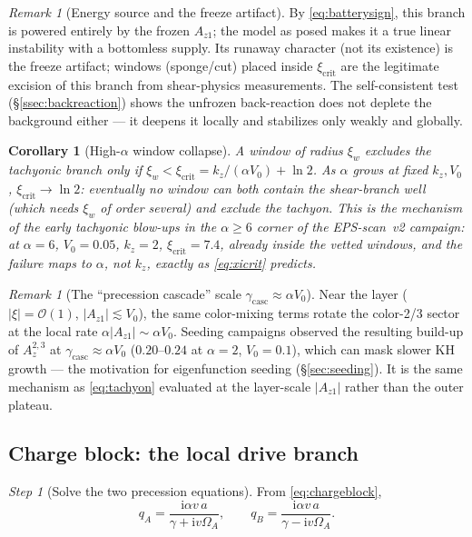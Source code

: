 \documentclass[11pt,a4paper]{article}
\numberwithin{equation}{section}
\newtheorem{cor}[lemma]{Corollary}
\theoremstyle{remark}
\newtheorem{remark}[lemma]{Remark}
\newtheorem{step}{Step}[subsection]
\newcommand{\Vo}{V_0}
\newcommand{\kz}{k_z}
\newcommand{\OmA}{\Omega_A}
\newcommand{\Az}{A_{z1}}
\newcommand{\ii}{\mathrm{i}}
\begin{document}
\begin{remark}[Energy source and the freeze artifact]
By \eqref{eq:batterysign}, this branch is powered entirely by the frozen
$\Az$; the model as posed makes it a true linear instability with a
bottomless supply. Its runaway character (not its existence) is the freeze
artifact; windows (sponge/cut) placed inside $\xi_{\mathrm{crit}}$ are the
legitimate excision of this branch from shear-physics measurements. The
self-consistent test (\S\ref{ssec:backreaction}) shows the unfrozen
back-reaction does not deplete the background either --- it deepens it
locally and stabilizes only weakly and globally.
\end{remark}

\begin{cor}[High-$\alpha$ window collapse]
\label{cor:highalpha}
A window of radius $\xi_w$ excludes the tachyonic branch only if
$\xi_w<\xi_{\mathrm{crit}}=\kz/(\alpha\Vo)+\ln2$. As $\alpha$ grows at
fixed $\kz,\Vo$, $\xi_{\mathrm{crit}}\to\ln2$: eventually \emph{no} window
can both contain the shear-branch well (which needs $\xi_w$ of order
several) and exclude the tachyon. This is the mechanism of the early
tachyonic blow-ups in the $\alpha\ge6$ corner of the EPS-scan~v2 campaign:
at $\alpha=6$, $\Vo=0.05$, $\kz=2$, $\xi_{\mathrm{crit}}=7.4$, already
inside the vetted windows, and the failure maps to $\alpha$, not $\kz$,
exactly as \eqref{eq:xicrit} predicts.
\end{cor}

\begin{remark}[The ``precession cascade'' scale $\gamma_{\mathrm{casc}}
\approx\alpha\Vo$]
Near the layer ($|\xi|=\mathcal O(1)$, $|\Az|\lesssim\Vo$), the same
color-mixing terms rotate the color-2/3 sector at the local rate
$\alpha|\Az|\sim\alpha\Vo$. Seeding campaigns observed the resulting
build-up of $A_z^{2,3}$ at $\gamma_{\mathrm{casc}}\approx\alpha\Vo$
($0.20$--$0.24$ at $\alpha=2$, $\Vo=0.1$), which can mask slower KH growth
--- the motivation for eigenfunction seeding (\S\ref{sec:seeding}). It is
the same mechanism as \eqref{eq:tachyon} evaluated at the layer-scale
$|\Az|$ rather than the outer plateau.
\end{remark}

\subsection{Charge block: the local drive branch}
\label{ssec:chargeblock}

\begin{step}[Solve the two precession equations]
From \eqref{eq:chargeblock},
\begin{equation}
q_A=\frac{\ii\alpha v\,a}{\gamma+\ii v\OmA},\qquad
q_B=\frac{\ii\alpha v\,a}{\gamma-\ii v\OmA}.
\label{eq:qsol}
\end{equation}
\end{step}
\end{document}
